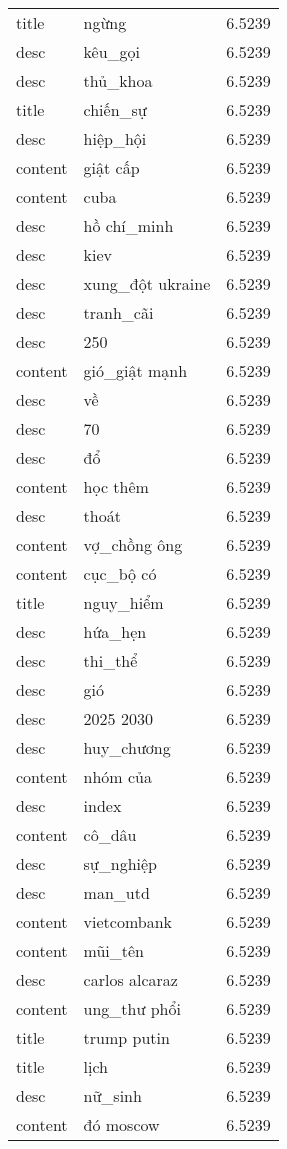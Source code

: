 \documentclass{article}
\begin{document}
\begin{tabular}{lll}
title & ngừng & 6.5239\\
desc & kêu\_gọi & 6.5239\\
desc & thủ\_khoa & 6.5239\\
title & chiến\_sự & 6.5239\\
desc & hiệp\_hội & 6.5239\\
content & giật cấp & 6.5239\\
content & cuba & 6.5239\\
desc & hồ chí\_minh & 6.5239\\
desc & kiev & 6.5239\\
desc & xung\_đột ukraine & 6.5239\\
desc & tranh\_cãi & 6.5239\\
desc & 250 & 6.5239\\
content & gió\_giật mạnh & 6.5239\\
desc & về & 6.5239\\
desc & 70 & 6.5239\\
desc & đổ & 6.5239\\
content & học thêm & 6.5239\\
desc & thoát & 6.5239\\
content & vợ\_chồng ông & 6.5239\\
content & cục\_bộ có & 6.5239\\
title & nguy\_hiểm & 6.5239\\
desc & hứa\_hẹn & 6.5239\\
desc & thi\_thể & 6.5239\\
desc & gió & 6.5239\\
desc & 2025 2030 & 6.5239\\
desc & huy\_chương & 6.5239\\
content & nhóm của & 6.5239\\
desc & index & 6.5239\\
content & cô\_dâu & 6.5239\\
desc & sự\_nghiệp & 6.5239\\
desc & man\_utd & 6.5239\\
content & vietcombank & 6.5239\\
content & mũi\_tên & 6.5239\\
desc & carlos alcaraz & 6.5239\\
content & ung\_thư phổi & 6.5239\\
title & trump putin & 6.5239\\
title & lịch & 6.5239\\
desc & nữ\_sinh & 6.5239\\
content & đó moscow & 6.5239\\

\end{tabular}
\end{document}
